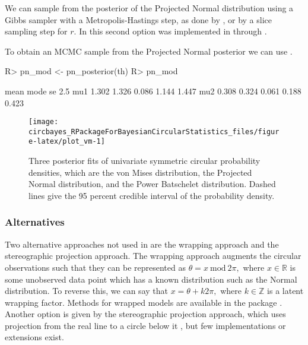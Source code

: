 We can sample from the posterior of the Projected Normal distribution
using a Gibbs sampler \citep{chib1995understanding} with a
Metropolis-Hastings \citep{metropolis1953equation, hastings1970monte}
step, as done by \citet{Nunez-Antonio2005}, or by a slice sampling
\citep{hernandez2017general} step for \(r\). In  this
second option was implemented in  through .

To obtain an MCMC sample from the Projected Normal posterior we can use
.

\begin{CodeChunk}

\begin{CodeInput}
R> pn_mod <- pn_posterior(th)
R> pn_mod 
\end{CodeInput}

\begin{CodeOutput}
     mean  mode    se  2.5%
mu1 1.302 1.326 0.086 1.144 1.447
mu2 0.308 0.324 0.061 0.188 0.423
\end{CodeOutput}
\end{CodeChunk}

\begin{CodeChunk}
\begin{figure}

{\centering \texttt{[image: circbayes\_RPackageForBayesianCircularStatistics\_files/figure-latex/plot\_vm-1]} 

}

\caption[Three posterior fits of univariate symmetric circular probability densities, which are the von Mises distribution, the Projected Normal distribution, and the Power Batschelet distribution]{Three posterior fits of univariate symmetric circular probability densities, which are the von Mises distribution, the Projected Normal distribution, and the Power Batschelet distribution. Dashed lines give the 95 percent credible interval of the probability density.}\label{fig:plot_vm}
\end{figure}
\end{CodeChunk}

\hypertarget{alternatives}{%
\subsubsection{Alternatives}\label{alternatives}}

Two alternative approaches not used in  are the wrapping
approach and the stereographic projection approach. The wrapping
approach augments the circular observations such that they can be
represented as \(\theta = x ~\text{mod} ~ 2\pi,\) where
\(x \in \mathbb{R}\) is some unobserved data point which has a known
distribution such as the Normal distribution. To reverse this, we can
say that \(x = \theta + k 2 \pi,\) where \(k \in \mathbb{Z}\) is a
latent wrapping factor. Methods for wrapped models are available in the
package  \citep{nadarajah2017wrapped}. Another option is
given by the stereographic projection approach, which uses projection
from the real line to a circle below it \citep{abe2010symmetric}, but
few implementations or extensions exist.

